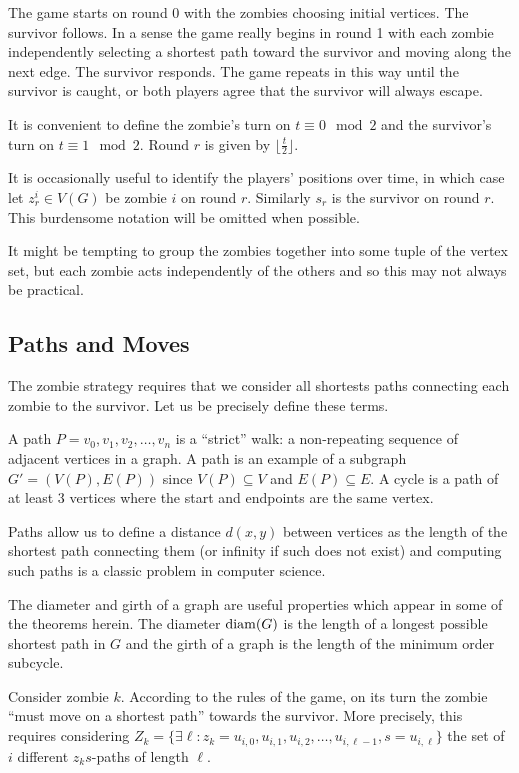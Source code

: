 The game starts on round 0 with the zombies choosing
initial vertices. The survivor follows. In a sense the game really begins in
round 1 with each zombie independently selecting a shortest path
toward the survivor and moving along the next edge.
The survivor responds. The game repeats in this way until the survivor is caught,
or both players agree that the survivor will always escape.

It is convenient to define the zombie's turn on $t \equiv 0 \mod{2}$ and the survivor's turn on $t \equiv 1 \mod{2}$.
Round $r$ is given by $\lfloor \frac{t}{2} \rfloor$.

It is occasionally useful to identify the players' positions over time, in which
case let $z_r^i \in V(G)$ be zombie $i$ on round $r$. Similarly $s_r$ is the
survivor on round $r$. This burdensome notation will be omitted when possible.

It might be tempting to group the zombies together
into some tuple of the vertex set, but each zombie acts independently of
the others and so this may not always be practical.

\subsection{Paths and Moves}
The zombie strategy requires that we consider all shortests paths connecting
each zombie to the survivor. Let us be precisely define these terms.

A path $P = v_0, v_1, v_2, \dots , v_n$ is a ``strict'' walk: a non-repeating sequence of
adjacent vertices in a graph. A path is an example of a subgraph $G' = (V(P), E(P))$ since $V(P) \subseteq V$ and $E(P) \subseteq E$. A cycle is a path of at least 3 vertices where the
start and endpoints are the same vertex.

Paths allow us to define a distance $d(x,y)$ between vertices as the length of the shortest path connecting them (or infinity if such does not exist) and computing such paths is a classic
problem in computer science.

The diameter and girth of a graph are useful properties which appear in some
of the theorems herein.
The diameter $\operatorname{diam}(G)$ is the length of a longest possible shortest path in $G$ and the girth of a graph is the length of the minimum order subcycle.

Consider zombie $k$. According to the rules of the game, on its turn the zombie
``must move on a shortest path'' towards the survivor. More precisely, this requires
considering $Z_k = \{  \exists \ell : z_k = u_{i,0}, u_{i, 1}, u_{i, 2}, \dots, u_{i, \ell-1}, s= u_{i, \ell}\}$ the set of $i$ different $z_ks$-paths of length $\ell$.

